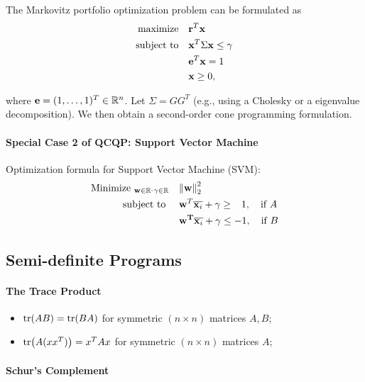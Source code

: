 The Markovitz portfolio optimization problem can be formulated as
\begin{align*}
    \text{maximize} \quad   & \mathbf{r}^T\mathbf{x}              \\
    \text{subject to} \quad & \mathbf{x}^T \Sigma \mathbf{x} \leq \gamma \\
                            & \mathbf{e}^T \mathbf{x} = 1         \\
                            & \mathbf{x} \geq 0,
\end{align*}

where \(\mathbf{e} = (1, \dots, 1)^T \in \mathbb{R}^n\). Let \(\Sigma = GG^T\) (e.g., using a Cholesky or a eigenvalue decomposition). We then obtain a second-order cone programming formulation.

\paragraph{Special Case 2 of QCQP: Support Vector Machine}

Optimization formula for Support Vector Machine (SVM):
\begin{align*}
    \text{Minimize }_{\mathbf{w} \in \mathbb{R}^, \gamma \in \mathbb{R}} \quad & \norm{\mathbf{w}}_2^2                                                       \\
    \text{subject to }                         \quad             & \mathbf{w}^T\overline{\mathbf{x}_i} + \gamma \geq \phantom{-}1, \quad \text{if } A \\
                                                                 & \mathbf{w^T}\overline{\mathbf{x}_i} + \gamma \leq - 1, \quad \text{if } B
\end{align*}

\subsection{Semi-definite Programs}

\paragraph{The Trace Product}
\begin{itemize}
    \item \(\tr(AB) = \tr(BA)\) for symmetric \((n \times n)\) matrices \(A, B\);
    \item \(\tr(A(xx^T)) = x^TAx\) for symmetric \((n \times n)\) matrices \(A\);
\end{itemize}

\paragraph{Schur's Complement}


